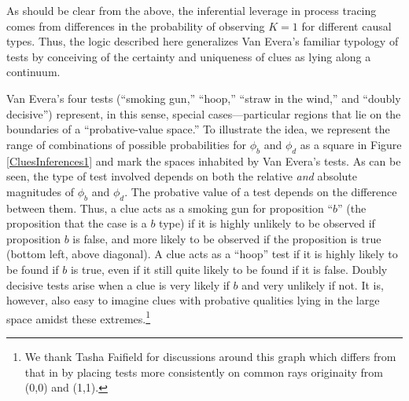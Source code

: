\documentclass[
  12pt,
]{book}
\begin{document}
As should be clear from the above, the inferential leverage in process tracing comes from differences in the probability of observing \(K=1\) for different causal types. Thus, the logic described here generalizes Van Evera's familiar typology of tests by conceiving of the certainty and uniqueness of clues as lying along a continuum.

Van Evera's four tests (``smoking gun,'' ``hoop,'' ``straw in the wind,'' and ``doubly decisive'') represent, in this sense, special cases---particular regions that lie on the boundaries of a ``probative-value space.'' To illustrate the idea, we represent the range of combinations of possible probabilities for \(\phi_b\) and \(\phi_d\) as a square in Figure \ref{CluesInferences1} and mark the spaces inhabited by Van Evera's tests. As can be seen, the type of test involved depends on both the relative \emph{and} absolute magnitudes of \(\phi_b\) and \(\phi_d\). The probative value of a test depends on the difference between them. Thus, a clue acts as a smoking gun for proposition ``\(b\)'' (the proposition that the case is a \(b\) type) if it is highly unlikely to be observed if proposition \(b\) is false, and more likely to be observed if the proposition is true (bottom left, above diagonal). A clue acts as a ``hoop'' test if it is highly likely to be found if \(b\) is true, even if it still quite likely to be found if it is false. Doubly decisive tests arise when a clue is very likely if \(b\) and very unlikely if not. It is, however, also easy to imagine clues with probative qualities lying in the large space amidst these extremes.\footnote{We thank Tasha Faifield for discussions around this graph which differs from that in \citet{humphreys2015mixing} by placing tests more consistently on common rays originaity from (0,0) and (1,1).}
\end{document}
